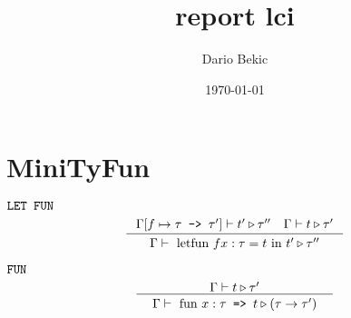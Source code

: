 \documentclass[a4paper,11pt]{report}
\title{report lci}
\author{Dario Bekic}
\date{\today}
\begin{document}
\maketitle
\tableofcontents

\begin{abstract}
\end{abstract}

\chapter{MiniTyFun}

$\verb|LET FUN|$
\\
\[
\inference[]
{ 
\Gamma[f \mapsto \tau \texttt{ -> } \tau'] \vdash t' \triangleright \tau''\quad
\Gamma \vdash t \triangleright \tau'
}
{
\begin{array}{c}
\Gamma \vdash  \text{ letfun } f x:\tau = t \text{ in } t' \triangleright \tau''
\end{array}
}
\]

$\verb|FUN|$
\\
\[
\inference[]
{ 
\Gamma \vdash t \triangleright \tau'
}
{
\begin{array}{c}
\Gamma \vdash  \text{ fun } x:\tau \texttt{ => } t \triangleright (\tau \rightarrow \tau')
\end{array}
}
\]
\end{document}
